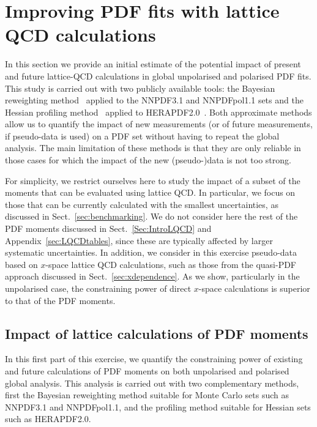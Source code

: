 \section{Improving PDF fits with lattice QCD calculations}
\label{sec:projections}

In this section we provide an initial estimate of the potential
impact of present and future lattice-QCD calculations
in global unpolarised and polarised PDF fits.
%
This study is carried out with two publicly available
tools: the
Bayesian reweighting
method~\cite{Ball:2011gg,Ball:2010gb} applied to the
NNPDF3.1 and NNPDFpol1.1 sets and the Hessian
profiling method~\cite{Camarda:2015zba} applied to
HERAPDF2.0~\cite{Abramowicz:2015mha}.
%
Both approximate methods allow us to quantify the impact of new measurements
(or of future measurements, if pseudo-data is used) on a PDF set without
having to repeat the global analysis.
%
The main limitation of these methods is that they are only reliable
in those cases for which the impact of the new (pseudo-)data
is not too strong.

For simplicity, we restrict  ourselves here to study the
impact of a subset of the moments that can be
evaluated using lattice QCD.
%
In particular,
we focus on those that can be currently calculated
with the smallest uncertainties, as discussed in
Sect.~\ref{sec:benchmarking}.
%
We do not consider here
the rest of the PDF moments discussed in
Sect.~\ref{Sec:IntroLQCD} and Appendix~\ref{sec:LQCDtables},
since these are typically affected by larger systematic uncertainties.
%
In addition, we consider in this exercise pseudo-data based on $x$-space
lattice QCD calculations, such as those from the quasi-PDF approach
discussed in Sect.~\ref{sec:xdependence}.
%
As we show, particularly in the unpolarised case, the
constraining power of direct $x$-space calculations is
superior to that of the PDF moments.

\subsection{Impact of lattice calculations of PDF moments}
In this first part of this exercise, we quantify the
constraining power of existing and future calculations
of PDF moments on both unpolarised and polarised
global analysis.
%
This analysis is carried out with two complementary methods,
first the Bayesian reweighting method suitable
for Monte Carlo sets such as NNPDF3.1 and
NNPDFpol1.1, and the profiling method suitable
for Hessian sets such as HERAPDF2.0.
%

